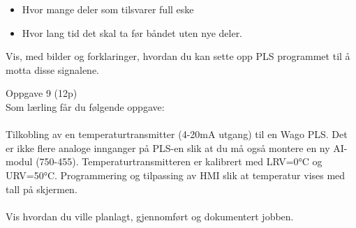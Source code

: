 \begin{itemize}[noitemsep]
	\item Hvor mange deler som tilsvarer full eske
	\item Hvor lang tid det skal ta før båndet uten nye deler. 
\end{itemize}
\vskip 5pt 
Vis, med bilder og forklaringer,  hvordan du kan sette opp PLS programmet til å motta disse signalene.
\vskip 0.5cm


\vfil\eject
Oppgave 9 (12p) \\ %
Som lærling får du følgende oppgave: \\\\
Tilkobling av en temperaturtransmitter (4-20mA utgang) til en Wago PLS. Det er ikke flere analoge innganger på PLS-en slik at du må også montere en ny AI-modul (750-455). Temperaturtransmitteren er kalibrert med LRV=0°C og URV=50°C. Programmering og tilpassing av HMI slik at temperatur vises med tall på skjermen. 
\\\\
Vis hvordan du ville planlagt, gjennomført og dokumentert jobben.


\vskip 5pt 


